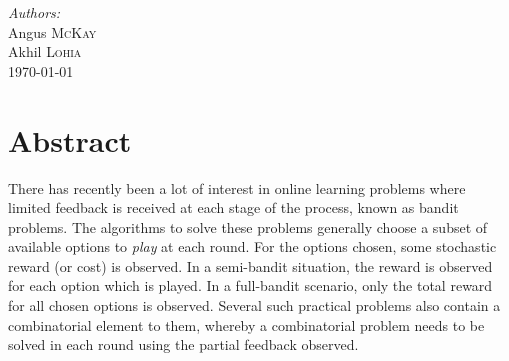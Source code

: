 \begin{titlepage}
\Large \emph{Authors:}\\
Angus \textsc{McKay}\\ %
Akhil \textsc{Lohia}\\[3cm] %


{\large \today}\\[3cm] %




\vfill %

\end{titlepage}


\section{Abstract}


There has recently been a lot of interest in online learning problems where limited feedback is received at each stage of the process, known as bandit problems. The algorithms to solve these problems generally choose a subset of available options to \emph{play} at each round. For the options chosen, some stochastic reward (or cost) is observed. In a semi-bandit situation, the reward is observed for each option which is played. In a full-bandit scenario, only the total reward for all chosen options is observed. Several such practical problems also contain a combinatorial element to them, whereby a combinatorial problem needs to be solved in each round using the partial feedback observed.\\

